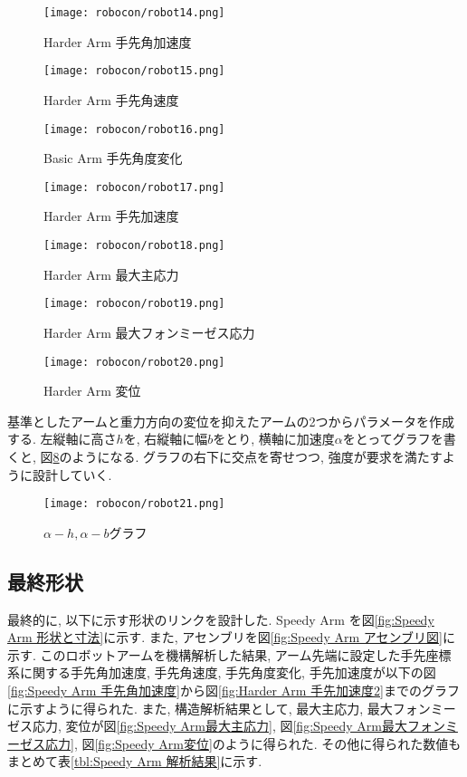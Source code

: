 \documentclass[10pt,b5paper,papersize,dvipdfmx]{jsbook}
\begin{document}
\begin{figure}[htbp]
  \centering
  \texttt{[image: robocon/robot14.png]}
  \caption{Harder Arm 手先角加速度}
  \label{fig:Harder Arm 手先角加速度}
\end{figure}
\begin{figure}[htbp]
  \centering
  \texttt{[image: robocon/robot15.png]}
  \caption{Harder Arm 手先角速度}
  \label{fig:Harder Arm 手先角速度}
\end{figure}
\begin{figure}[htbp]
  \centering
  \texttt{[image: robocon/robot16.png]}
  \caption{Basic Arm 手先角度変化}
  \label{fig:Basic Arm 手先角度変化}
\end{figure}
\begin{figure}[htbp]
  \centering
  \texttt{[image: robocon/robot17.png]}
  \caption{Harder Arm 手先加速度}
  \label{fig:Harder Arm 手先加速度}
\end{figure}
\begin{figure}[htbp]
  \centering
  \texttt{[image: robocon/robot18.png]}
  \caption{Harder Arm 最大主応力}
  \label{fig:Harder Arm 最大主応力}
\end{figure}
\begin{figure}[htbp]
  \centering
  \texttt{[image: robocon/robot19.png]}
  \caption{Harder Arm 最大フォンミーゼス応力}
  \label{fig:Harder Arm 最大フォンミーゼス応力}
\end{figure}
\begin{figure}[htbp]
  \centering
  \texttt{[image: robocon/robot20.png]}
  \caption{Harder Arm 変位}
  \label{fig:Harder Arm 変位}
\end{figure}
基準としたアームと重力方向の変位を抑えたアームの2つからパラメータを作成する. 左縦軸に高さ$h$を, 右縦軸に幅$b$をとり, 横軸に加速度$\alpha$をとってグラフを書くと, 図\ref{fig:alpha-h, alpha-b グラフ}のようになる. グラフの右下に交点を寄せつつ, 強度が要求を満たすように設計していく.
\begin{figure}[htbp]
  \centering
  \texttt{[image: robocon/robot21.png]}
  \caption{$\alpha-h, \alpha-b$グラフ}
  \label{fig:alpha-h, alpha-b グラフ}
\end{figure}

\clearpage
\subsection{最終形状}
最終的に, 以下に示す形状のリンクを設計した. Speedy Arm を図\ref{fig:Speedy Arm 形状と寸法}に示す. また, アセンブリを図\ref{fig:Speedy Arm アセンブリ図}に示す. 
このロボットアームを機構解析した結果, アーム先端に設定した手先座標系に関する手先角加速度, 手先角速度, 手先角度変化, 手先加速度が以下の図\ref{fig:Speedy Arm 手先角加速度}から図\ref{fig:Harder Arm 手先加速度2}までのグラフに示すように得られた. 
また, 構造解析結果として, 最大主応力, 最大フォンミーゼス応力, 変位が図\ref{fig:Speedy Arm最大主応力}, 図\ref{fig:Speedy Arm最大フォンミーゼス応力}, 図\ref{fig:Speedy Arm変位}のように得られた. 
その他に得られた数値もまとめて表\ref{tbl:Speedy Arm 解析結果}に示す.
\end{document}
